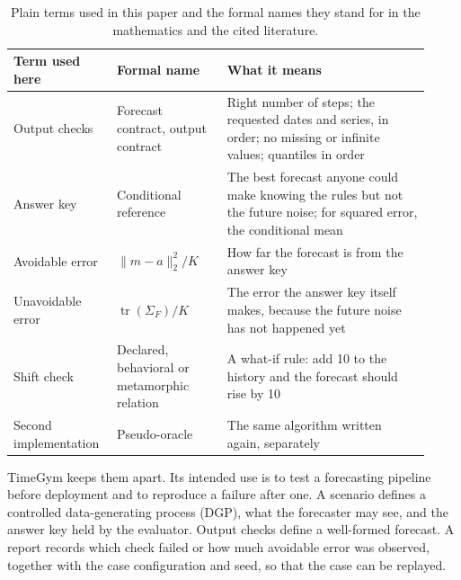 \documentclass[11pt,a4paper]{article}
\begin{document}
\begin{table}[t]
\centering\small
\begin{tabular}{@{}>{\raggedright\arraybackslash}p{0.21\linewidth}>{\raggedright\arraybackslash}p{0.25\linewidth}>{\raggedright\arraybackslash}p{0.46\linewidth}@{}}
\toprule
Term used here & Formal name & What it means \\
\midrule
Output checks & Forecast contract, output contract & Right number of steps; the requested dates and series, in order; no missing or infinite values; quantiles in order \\[0.3em]
Answer key & Conditional reference & The best forecast anyone could make knowing the rules but not the future noise; for squared error, the conditional mean \\[0.3em]
Avoidable error & $\|m-a\|_2^2/K$ & How far the forecast is from the answer key \\[0.3em]
Unavoidable error & $\operatorname{tr}(\Sigma_F)/K$ & The error the answer key itself makes, because the future noise has not happened yet \\[0.3em]
Shift check & Declared, behavioral or metamorphic relation & A what-if rule: add 10 to the history and the forecast should rise by 10 \\[0.3em]
Second implementation & Pseudo-oracle & The same algorithm written again, separately \\
\bottomrule
\end{tabular}
\caption{Plain terms used in this paper and the formal names they stand
for in the mathematics and the cited literature.}
\label{tab:terms}
\end{table}

TimeGym keeps them apart. Its intended use is to test a forecasting
pipeline before deployment and to reproduce a failure after one. A
scenario defines a controlled data-generating process (DGP), what the
forecaster may see, and the answer key held by the evaluator. Output
checks define a well-formed forecast. A report records which check failed
or how much avoidable error was observed, together with the case
configuration and seed, so that the case can be replayed.
\end{document}
